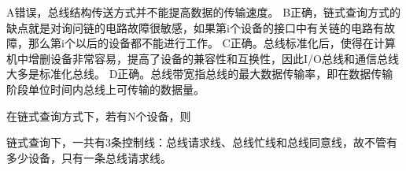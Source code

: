 \begin{solution}A错误，总线结构传送方式并不能提高数据的传输速度。
B正确，链式查询方式的缺点就是对询问链的电路故障很敏感，如果第i个设备的接口中有关链的电路有故障，那么第i个以后的设备都不能进行工作。
C正确。总线标准化后，使得在计算机中增删设备非常容易，提高了设备的兼容性和互换性，因此I/O总线和通信总线大多是标准化总线。
D正确。总线带宽指总线的最大数据传输率，即在数据传输阶段单位时间内总线上可传输的数据量。
\end{solution}
\question 在链式查询方式下，若有N个设备，则
\par{}
\begin{solution}链式查询下，一共有3条控制线：总线请求线、总线忙线和总线同意线，故不管有多少设备，只有一条总线请求线。
\end{solution}
